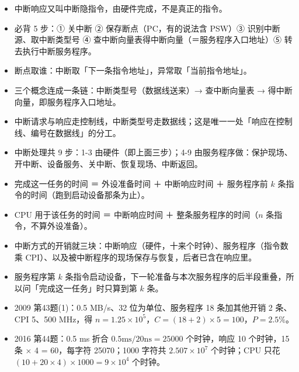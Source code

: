 \documentclass[10pt,a4paper]{ctexart}
\begin{document}
\begin{itemize}

\item 中断响应又叫中断隐指令，由硬件完成，不是真正的指令。

\item 必背 5 步：① 关中断 ② 保存断点（PC，有的说法含 PSW）③ 识别中断源、取中断类型号 ④ 查中断向量表得中断向量（＝服务程序入口地址）⑤ 转去执行中断服务程序。

\item 断点取谁：中断取「下一条指令地址」，异常取「当前指令地址」。

\item 三个概念连成一条链：中断类型号（数据线送来）→ 查中断向量表 → 得中断向量，即服务程序入口地址。

\item 中断请求与响应走控制线，中断类型号走数据线；这是唯一一处「响应在控制线、编号在数据线」的分工。

\item 中断处理共 9 步：1-3 由硬件（即上面三步）；4-9 由服务程序做：保护现场、开中断、设备服务、关中断、恢复现场、中断返回。

\item 完成这一任务的时间 ＝ 外设准备时间 ＋ 中断响应时间 ＋ 服务程序前 $k$ 条指令的时间（跑到启动设备那条为止）。

\item CPU 用于该任务的时间 ＝ 中断响应时间 ＋ 整条服务程序的时间（$n$ 条指令，不算外设准备）。

\item 中断方式的开销就三块：中断响应（硬件，十来个时钟）、服务程序（指令数乘 CPI）、以及被中断程序的现场保存与恢复，后者已含在响应里。

\item 服务程序第 $k$ 条指令启动设备，下一轮准备与本次服务程序的后半段重叠，所以问「完成这一任务」时只算到第 $k$ 条。

\item 2009 第43题(1)：0.5 MB/s、32 位为单位、服务程序 18 条加其他开销 2 条、CPI 5、500 MHz，得 $n=1.25\times10^5$，$C=(18+2)\times5=100$，$P=2.5\%$。

\item 2016 第44题：0.5 ms 折合 $0.5\text{ms}/20\text{ns}=25000$ 个时钟，响应 10 个时钟，15 条 $\times$ 4 = 60，每字符 25070；1000 字符共 $2.507\times10^7$ 个时钟；CPU 只花 $(10+20\times4)\times1000=9\times10^4$ 个时钟。

\end{itemize}
\end{document}
